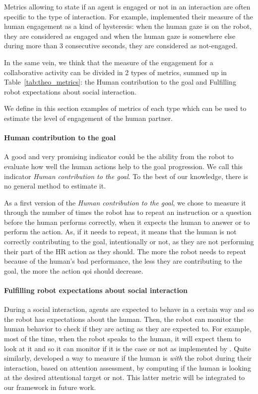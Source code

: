 \documentclass[a4paper,11pt,twoside]{StyleThese}
\begin{document}
Metrics allowing to state if an agent is engaged or not in an interaction are often specific to the type of interaction. For example, \cite{fan2017} implemented their measure of the human engagement as a kind of hysteresis: when the human gaze is on the robot, they are considered as engaged and when the human gaze is somewhere else during more than 3 consecutive seconds, they are considered as not-engaged. 

In the same vein, we think that the measure of the engagement for a collaborative activity can be divided in 2 types of metrics, summed up in Table~\ref{tab:theo_metrics}: the Human contribution to the goal and Fulfilling robot expectations about social interaction.

We define in this section examples of metrics of each type which can be used to estimate the level of engagement of the human partner. 

\paragraph{Human contribution to the goal}\label{subsubsec:h_contrib}

A good and very promising indicator could be the ability from the robot to evaluate how well the human actions help to the goal progression. We call this indicator \textit{Human contribution to the goal}. To the best of our knowledge, there is no general method to estimate it. 

As a first version of the \textit{Human contribution to the goal}, we chose to measure it through the number of times the robot has to repeat an instruction or a question before the human performs correctly, when it expects the human to answer or to perform the action. As, if it needs to repeat, it means that the human is not correctly contributing to the goal, intentionally or not, as they are not performing their part of the HR action as they should. The more the robot needs to repeat because of the human's bad performance, the less they are contributing to the goal, the more the action \acrshort{qoi} should decrease. 

\paragraph{Fulfilling robot expectations about social interaction}\label{subsubsec:r_exp}
During a social interaction, agents are expected to behave in a certain way and so the robot has expectations about the human. Then, the robot can monitor the human behavior to check if they are acting as they are expected to. For example, most of the time, when the robot speaks to the human, it will expect them to look at it and so it can monitor if it is the case or not as implemented by \cite{fan2017}. Quite similarly, \cite{lemaignan2016} developed a way to measure if the human is \textit{with} the robot during their interaction, based on attention assessment, by computing if the human is looking at the desired attentional target or not. This latter metric will be integrated to our framework in future work.
\end{document}
